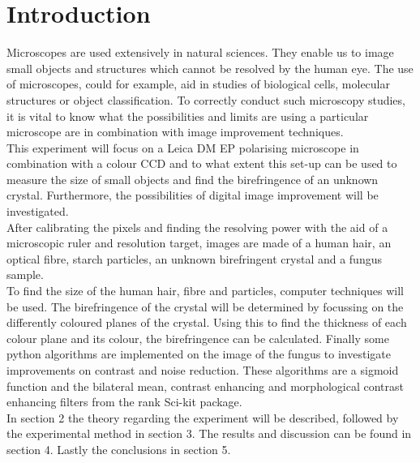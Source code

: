 \section{Introduction}
Microscopes are used extensively in natural sciences. They enable us to image small objects and structures which cannot be resolved by the human eye. The use of microscopes, could for example, aid in studies of biological cells, molecular structures or object classification. To correctly conduct such microscopy studies, it is vital to know what the possibilities and limits are using a particular microscope are in combination with image improvement techniques.\\
This experiment will focus on a Leica DM EP polarising microscope in combination with a colour CCD and to what extent this set-up can be used to measure the size of small objects and find the birefringence of an unknown crystal. Furthermore, the possibilities of digital image improvement will be investigated.\\
After calibrating the pixels and finding the resolving power with the aid of a microscopic ruler and resolution target, images are made of a human hair, an optical fibre, starch particles, an unknown birefringent crystal and a fungus sample.\\
To find the size of the human hair, fibre and particles, computer techniques will be used. The birefringence of the crystal will be determined by focussing on the differently coloured planes of the crystal. Using this to find the thickness of each colour plane and its colour, the birefringence can be calculated. Finally some python algorithms are implemented on the image of the fungus to investigate improvements on contrast and noise reduction. These algorithms are a sigmoid function and the bilateral mean, contrast enhancing and morphological contrast enhancing filters from the rank Sci-kit package. \\
In section 2 the theory regarding the experiment will be described, followed by the experimental method in section 3. The results and discussion can be found in section 4. Lastly the conclusions in section 5.









